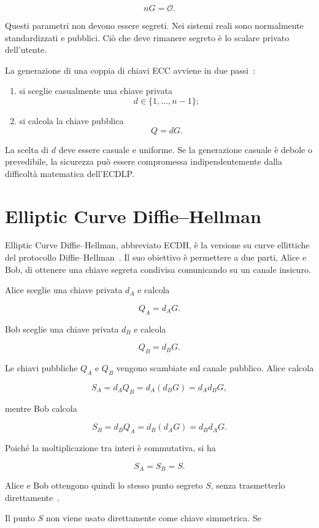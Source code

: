 \documentclass[12pt,a4paper,oneside]{report}
\begin{document}
\[
nG=\mathcal{O}.
\]

Questi parametri non devono essere segreti. Nei sistemi reali sono normalmente standardizzati e pubblici. Ciò che deve rimanere segreto è lo scalare privato dell'utente.

La generazione di una coppia di chiavi ECC avviene in due passi~\cite{margara_ec,sec1}:

\begin{enumerate}
    \item si sceglie casualmente una chiave privata
    \[
    d \in \{1,\ldots,n-1\};
    \]
    \item si calcola la chiave pubblica
    \[
    Q=dG.
    \]
\end{enumerate}

La scelta di \(d\) deve essere casuale e uniforme. Se la generazione casuale è debole o prevedibile, la sicurezza può essere compromessa indipendentemente dalla difficoltà matematica dell'ECDLP.

\section{Elliptic Curve Diffie--Hellman}

Elliptic Curve Diffie--Hellman, abbreviato ECDH, è la versione su curve ellittiche del protocollo Diffie--Hellman~\cite{margara_dh,sec1}. Il suo obiettivo è permettere a due parti, Alice e Bob, di ottenere una chiave segreta condivisa comunicando su un canale insicuro.

Alice sceglie una chiave privata \(d_A\) e calcola

\[
Q_A=d_A G.
\]

Bob sceglie una chiave privata \(d_B\) e calcola

\[
Q_B=d_B G.
\]

Le chiavi pubbliche \(Q_A\) e \(Q_B\) vengono scambiate sul canale pubblico. Alice calcola

\[
S_A=d_A Q_B=d_A(d_B G)=d_A d_B G,
\]

mentre Bob calcola

\[
S_B=d_B Q_A=d_B(d_A G)=d_B d_A G.
\]

Poiché la moltiplicazione tra interi è commutativa, si ha

\[
S_A=S_B=S.
\]

Alice e Bob ottengono quindi lo stesso punto segreto \(S\), senza trasmetterlo direttamente~\cite{margara_dh,sec1}.

Il punto \(S\) non viene usato direttamente come chiave simmetrica. Se
\end{document}
